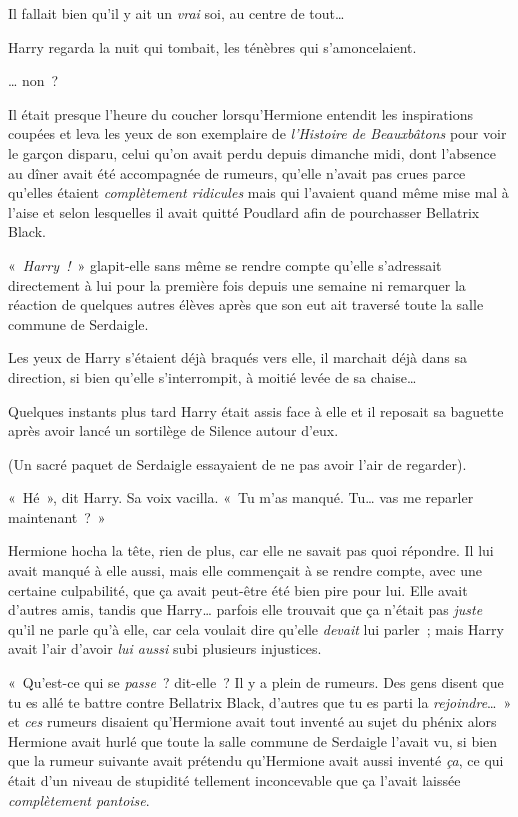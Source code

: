 Il fallait bien qu'il y ait un \emph{vrai} soi, au centre de tout…

Harry regarda la nuit qui tombait, les ténèbres qui s'amoncelaient.

… non~?

\later

Il était presque l'heure du coucher lorsqu'Hermione entendit les inspirations coupées et leva les yeux de son exemplaire de \emph{l'Histoire de Beauxbâtons} pour voir le garçon disparu, celui qu'on avait perdu depuis dimanche midi, dont l'absence au dîner avait été accompagnée de rumeurs, qu'elle n'avait pas crues parce qu'elles étaient \emph{complètement ridicules} mais qui l'avaient quand même mise mal à l'aise et selon lesquelles il avait quitté Poudlard afin de pourchasser Bellatrix Black.

«~\emph{Harry~!}~» glapit-elle sans même se rendre compte qu'elle s'adressait directement à lui pour la première fois depuis une semaine ni remarquer la réaction de quelques autres élèves après que son eut ait traversé toute la salle commune de Serdaigle.

Les yeux de Harry s'étaient déjà braqués vers elle, il marchait déjà dans sa direction, si bien qu'elle s'interrompit, à moitié levée de sa chaise…

Quelques instants plus tard Harry était assis face à elle et il reposait sa baguette après avoir lancé un sortilège de Silence autour d'eux.

(Un sacré paquet de Serdaigle essayaient de ne pas avoir l'air de regarder).

«~Hé~», dit Harry.
Sa voix vacilla.
«~Tu m'as manqué.
Tu… vas me reparler maintenant~?~»

Hermione hocha la tête, rien de plus, car elle ne savait pas quoi répondre.
Il lui avait manqué à elle aussi, mais elle commençait à se rendre compte, avec une certaine culpabilité, que ça avait peut-être été bien pire pour lui.
Elle avait d'autres amis, tandis que Harry… parfois elle trouvait que ça n'était pas \emph{juste} qu'il ne parle qu'à elle, car cela voulait dire qu'elle \emph{devait} lui parler~; mais Harry avait l'air d'avoir \emph{lui aussi} subi plusieurs injustices.

«~Qu'est-ce qui se \emph{passe}~? dit-elle~?
Il y a plein de rumeurs.
Des gens disent que tu es allé te battre contre Bellatrix Black, d'autres que tu es parti la \emph{rejoindre}…~»
et \emph{ces} rumeurs disaient qu'Hermione avait tout inventé au sujet du phénix alors Hermione avait hurlé que toute la salle commune de Serdaigle l'avait vu, si bien que la rumeur suivante avait prétendu qu'Hermione avait aussi inventé \emph{ça}, ce qui était d'un niveau de stupidité tellement inconcevable que ça l'avait laissée \emph{complètement pantoise}.


